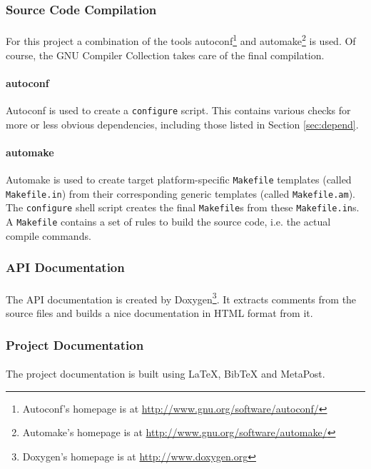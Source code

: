 \subsubsection{Source Code Compilation}
\paragraph{}
For this project a combination of the tools autoconf\footnote{Autoconf's homepage is at \href{http://www.gnu.org/software/autoconf/}{http://www.gnu.org/software/autoconf/}} and automake\footnote{Automake's homepage is at \href{http://www.gnu.org/software/automake/}{http://www.gnu.org/software/automake/}} is used. Of course, the GNU Compiler Collection  takes care of the final compilation.

\paragraph{autoconf}
Autoconf is used to create a \texttt{configure} script. This contains various checks for more or less obvious dependencies, including those listed in Section \ref{sec:depend}.

\paragraph{automake}
Automake is used to create target platform-specific \texttt{Makefile} templates (called \texttt{Makefile.in}) from their corresponding generic templates (called \texttt{Makefile.am}). The \texttt{configure} shell script creates the final \texttt{Makefile}s from these \texttt{Makefile.in}s. A \texttt{Makefile} contains a set of rules to build the source code, i.e. the actual compile commands.

\subsubsection{API Documentation}
\paragraph{}
The API documentation is created by Doxygen\footnote{Doxygen's homepage is at \href{http://www.doxygen.org}{http://www.doxygen.org}}. It extracts comments from the source files and builds a nice documentation in HTML format from it.


\subsubsection{Project Documentation}
\paragraph{}
The project documentation is built using \LaTeX, BibTeX and MetaPost.
